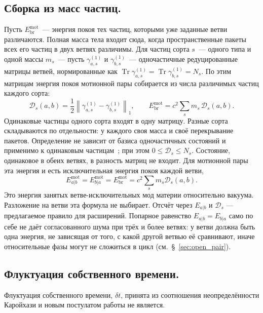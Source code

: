 \documentclass[12pt,a4paper]{article}
\begin{document}
\subsection{Сборка из масс частиц.}
\label{sec:particle_count}
Пусть $E_{\mathrm{br}}^{\mathrm{mot}}$~--- энергия покоя тех частиц, которыми уже заданные ветви различаются. Полная масса тела входит сюда, когда пространственные пакеты всех его частиц в двух ветвях различимы. Для частиц сорта $s$~--- одного типа и одной массы $m_s$~--- пусть $\gamma^{(1)}_{a,s}$ и $\gamma^{(1)}_{b,s}$~--- одночастичные редуцированные матрицы ветвей, нормированные как $\operatorname{Tr}\gamma^{(1)}_{a,s}=\operatorname{Tr}\gamma^{(1)}_{b,s}=N_s$. По этим матрицам энергия покоя мотионной пары собирается из числа различимых частиц каждого сорта:
\begin{equation}
\mathcal D_s(a,b)=\frac12\left\|\gamma^{(1)}_{a,s}-\gamma^{(1)}_{b,s}\right\|_1,
\qquad
E_{\mathrm{br}}^{\mathrm{mot}}=c^2\sum_s m_s\,\mathcal D_s(a,b).
\label{eq:ebr_dist}
\end{equation}
Одинаковые частицы одного сорта входят в одну матрицу. Разные сорта складываются по отдельности: у каждого своя масса и своё перекрывание пакетов. Определение не зависит от базиса одночастичных состояний и применимо к одинаковым частицам~\cite{korsbakken2007}; при этом $0\le\mathcal D_s\le N_s$. Состояние, одинаковое в обеих ветвях, в разность матриц не входит. Для мотионной пары эта энергия и есть исключительная энергия покоя каждой ветви,
\begin{equation}
E_{a|b}^{\mathrm{mot}}
=E_{b|a}^{\mathrm{mot}}
=E_{\mathrm{br}}^{\mathrm{mot}}
=c^2\sum_s m_s\mathcal D_s(a,b).
\label{eq:exclusive_energy}
\end{equation}
Это энергия занятых ветве-исключительных мод материи относительно вакуума. Разложение на ветви эта формула не выбирает. Отсчёт через $E_{a|b}$ и $\mathcal D_s$ --- предлагаемое правило для расширений. Попарное равенство $E_{a|b}=E_{b|a}$ само по себе не даёт согласованного шума при трёх и более ветвях: у ветви должна быть одна энергия, не зависящая от того, с какой другой ветвью её сравнивают, иначе относительные фазы могут не сложиться в цикл (см.~\S~\ref{sec:open_pair}).

\subsection{Флуктуация собственного времени.}
Флуктуация собственного времени, $\delta t$, принята из соотношения неопределённости Каройхази и новым постулатом работы не является.
\end{document}
